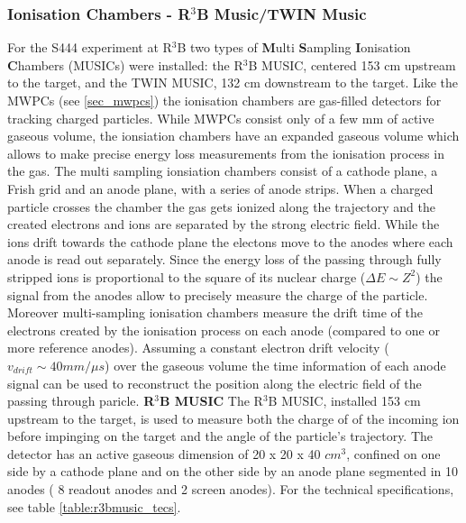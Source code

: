 \subsubsection{Ionisation Chambers - R$^3$B Music/TWIN Music}\label{sec:ionisation_chambers}
For the S444 experiment at R$^3$B two types of \textbf{M}ulti \textbf{S}ampling \textbf{I}onisation \textbf{C}hambers (MUSICs) were installed: the R$^3$B MUSIC, centered 153 cm upstream to the target, and the TWIN MUSIC, 132 cm downstream to the target. Like the MWPCs (see \ref{sec_mwpcs}) the ionisation chambers are gas-filled detectors for tracking charged particles. While MWPCs consist only of a few mm of active gaseous volume, the ionsiation chambers have an expanded gaseous volume which allows to make precise energy loss measurements from the ionisation process in the gas. The multi sampling ionsiation chambers consist of a cathode plane, a Frish grid  and an anode plane, with a series of anode strips. When a charged particle crosses the chamber the gas gets ionized along the trajectory and the created electrons and ions are separated by the strong electric field. While the ions drift towards the cathode plane the electons move to the anodes where each anode is read out separately. Since the energy loss of the passing through fully stripped ions is proportional to the square of its nuclear charge ($\Delta E \sim Z^2$) the signal from the anodes allow to precisely measure the charge of the particle. Moreover multi-sampling ionisation chambers measure the drift time of the electrons created by the ionisation process  on each anode (compared to one or more reference anodes). Assuming a constant electron drift velocity ($ v_{drift} \sim 40 mm/\mu s$) over the gaseous volume the time information of each anode signal can be used to reconstruct the position along the electric field of the passing through paricle.\newline
\textbf{R$^3$B MUSIC}\newline
The R$^3$B MUSIC, installed 153 cm upstream to the target, is used to measure both the  charge of of the incoming ion before impinging on the target and the angle of the particle's trajectory. The detector has an active gaseous dimension of 20 x 20 x 40 $cm^3$, confined on one side by a cathode plane and on the other side by an anode plane segmented in 10 anodes ( 8 readout anodes and 2 screen anodes). For the technical specifications, see table \ref{table:r3bmusic_tecs}. \newline
